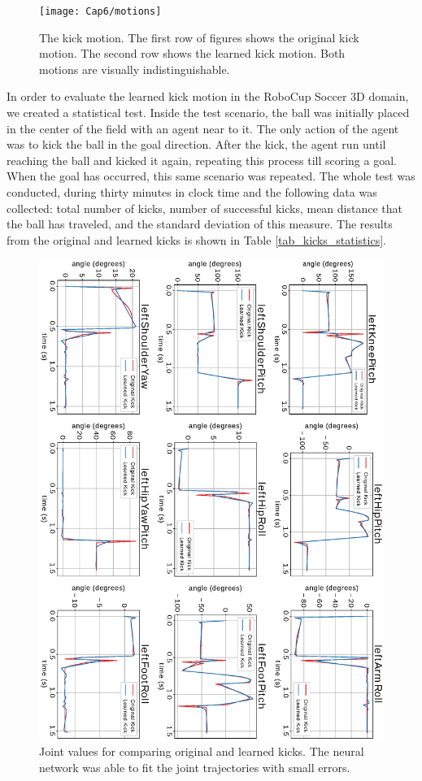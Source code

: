 \begin{figure}[!htbp]
\centering
\texttt{[image: Cap6/motions]}
\caption{The kick motion. The first row of figures shows the original kick motion. The second row shows the learned kick motion. Both motions are visually indistinguishable.}
\label{fig:motions}
\end{figure} 

In order to evaluate the learned kick motion in the RoboCup Soccer 3D domain, we created a statistical test. Inside the test scenario, the ball was initially placed in the center of the field with an agent near to it. The only action of the agent was to kick the ball in the goal direction. After the kick, the agent run until reaching the ball and kicked it again, repeating this process till scoring a goal. When the goal has occurred, this same scenario was repeated. The whole test was conducted, during thirty minutes in clock time and the following data was collected: total number of kicks, number of successful kicks, mean distance that the ball has traveled, and the standard deviation of this measure. The results from the original and learned kicks is shown in Table \ref{tab_kicks_statistics}.


\begin{figure}[!htbp]
\centering
\includegraphics[angle=90,width=1\textwidth]{Cap6/kick_joints_curve}
\caption{Joint values for comparing original and learned kicks. The neural network was able to fit the joint trajectories with small errors.}
\label{fig:kick_joints_curves}
\end{figure}


